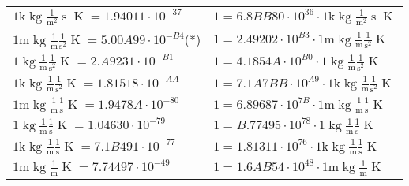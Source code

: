 \begin{center}
\begin{longtable}{l l}
{\color{gray}$1 \bm{\mathrm{ k}}\operatorname{kg}\frac1{\operatorname{m}^2}{\operatorname{s}}{}{\operatorname{K}} = 1.94011\cdot10^{-37} $}   & {\color{gray}$ 1 = 6.8BB80\cdot10^{36} \cdot 1 \bm{\mathrm{ k}}\operatorname{kg}\frac1{\operatorname{m}^2}{\operatorname{s}}{}{\operatorname{K}}$}  \\
{\color{gray}$1 \bm{\mathrm{ m}}\operatorname{kg}\frac1{\operatorname{m}}\frac1{\operatorname{s}^2}{}{\operatorname{K}} = 5.00A99\cdot10^{-B4} $}\quad(*) & {\color{gray}$ 1 = 2.49202\cdot10^{B3} \cdot 1 \bm{\mathrm{ m}}\operatorname{kg}\frac1{\operatorname{m}}\frac1{\operatorname{s}^2}{}{\operatorname{K}}$}  \\
{\color{black}$1 \bm{\mathrm{ }}\operatorname{kg}\frac1{\operatorname{m}}\frac1{\operatorname{s}^2}{}{\operatorname{K}} = 2.A9231\cdot10^{-B1} $}   & {\color{black}$ 1 = 4.1854A\cdot10^{B0} \cdot 1 \bm{\mathrm{ }}\operatorname{kg}\frac1{\operatorname{m}}\frac1{\operatorname{s}^2}{}{\operatorname{K}}$}  \\
{\color{gray}$1 \bm{\mathrm{ k}}\operatorname{kg}\frac1{\operatorname{m}}\frac1{\operatorname{s}^2}{}{\operatorname{K}} = 1.81518\cdot10^{-AA} $}   & {\color{gray}$ 1 = 7.1A7BB\cdot10^{A9} \cdot 1 \bm{\mathrm{ k}}\operatorname{kg}\frac1{\operatorname{m}}\frac1{\operatorname{s}^2}{}{\operatorname{K}}$}  \\
{\color{gray}$1 \bm{\mathrm{ m}}\operatorname{kg}\frac1{\operatorname{m}}\frac1{\operatorname{s}}{}{\operatorname{K}} = 1.9478A\cdot10^{-80} $}   & {\color{gray}$ 1 = 6.89687\cdot10^{7B} \cdot 1 \bm{\mathrm{ m}}\operatorname{kg}\frac1{\operatorname{m}}\frac1{\operatorname{s}}{}{\operatorname{K}}$}  \\
{\color{black}$1 \bm{\mathrm{ }}\operatorname{kg}\frac1{\operatorname{m}}\frac1{\operatorname{s}}{}{\operatorname{K}} = 1.04630\cdot10^{-79} $}   & {\color{black}$ 1 = B.77495\cdot10^{78} \cdot 1 \bm{\mathrm{ }}\operatorname{kg}\frac1{\operatorname{m}}\frac1{\operatorname{s}}{}{\operatorname{K}}$}  \\
{\color{gray}$1 \bm{\mathrm{ k}}\operatorname{kg}\frac1{\operatorname{m}}\frac1{\operatorname{s}}{}{\operatorname{K}} = 7.1B491\cdot10^{-77} $}   & {\color{gray}$ 1 = 1.81311\cdot10^{76} \cdot 1 \bm{\mathrm{ k}}\operatorname{kg}\frac1{\operatorname{m}}\frac1{\operatorname{s}}{}{\operatorname{K}}$}  \\
{\color{gray}$1 \bm{\mathrm{ m}}\operatorname{kg}\frac1{\operatorname{m}}{}{}{\operatorname{K}} = 7.74497\cdot10^{-49} $}   & {\color{gray}$ 1 = 1.6AB54\cdot10^{48} \cdot 1 \bm{\mathrm{ m}}\operatorname{kg}\frac1{\operatorname{m}}{}{}{\operatorname{K}}$}  \\

\end{longtable}
\end{center}
